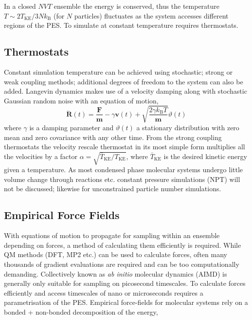 \documentclass[main.tex]{subfiles}
\begin{document}
In a closed $NVT$ ensemble the energy is conserved, thus the temperature $T \sim 2 T_\text{KE} / 3Nk_\text{B}$ (for $N$ particles) fluctuates as the system accesses different regions of the PES. To simulate at constant temperature  requires thermostats.

\subsection{Thermostats}

Constant simulation temperature can be achieved using stochastic; strong or weak coupling methods; additional degrees of freedom to the system can also be added. Langevin dynamics makes use of a velocity damping along with stochastic Gaussian random noise with an equation of motion,
\begin{equation}
	\ddot{\boldsymbol{R}}(t) = \frac{\boldsymbol{F}}{\boldsymbol{m}} - \gamma \boldsymbol{v}(t) + \sqrt{\frac{2\gamma k_\text{B} T}{\boldsymbol{m}}} \vartheta(t)
\end{equation}
where $\gamma$ is a damping parameter and $\vartheta(t)$ a stationary distribution with zero mean and zero covariance with any other time. From the strong coupling thermostats the velocity rescale thermostat in its most simple form multiplies all the velocities by a factor $\alpha = \sqrt{\bar{T}_\text{KE} / T_\text{KE}}$, where $\bar{T}_\text{KE}$ is the desired kinetic energy given a temperature.\cite{Bussi2007} As most condensed phase molecular systems undergo little volume change through reactions etc. constant pressure simulations (NPT) will not be discussed; likewise for unconstrained particle number simulations. 

\subsection{Empirical Force Fields}

With equations of motion to propagate for sampling within an ensemble depending on forces, a method of calculating them efficiently is required. While QM methods (DFT, MP2 etc.) can be used to calculate forces, often many thousands of gradient evaluations are required and can be too computationally demanding. Collectively known as \emph{ab initio} molecular dynamics (AIMD) is generally only suitable for sampling on picosecond timescales.\cite{Iftimie2005} To calculate forces efficiently and access timescales of nano or microseconds requires a parametrisation of the PES. Empirical force-fields for molecular systems rely on a bonded + non-bonded decomposition of the energy,
\end{document}
